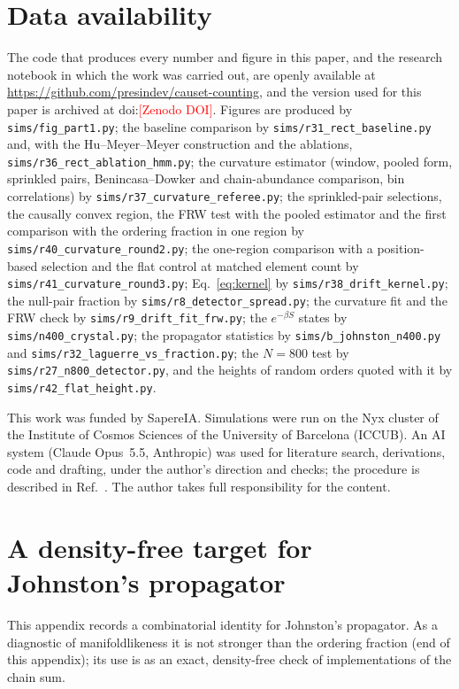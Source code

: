 \documentclass[prd,twocolumn,superscriptaddress,nofootinbib,amsmath,amssymb,floatfix]{revtex4-2}
\newcommand{\pending}[1]{\textcolor{red}{[#1]}}
\begin{document}
\section*{Data availability}
The code that produces every number and figure in this paper, and the research notebook in which the work was carried out, are openly available at \url{https://github.com/presindev/causet-counting}, and the version used for this paper is archived at doi:\pending{Zenodo DOI}. Figures are produced by \texttt{sims/fig\_part1.py}; the baseline comparison by \texttt{sims/r31\_rect\_baseline.py} and, with the Hu--Meyer--Meyer construction and the ablations, \texttt{sims/r36\_rect\_ablation\_hmm.py}; the curvature estimator (window, pooled form, sprinkled pairs, Benincasa--Dowker and chain-abundance comparison, bin correlations) by \texttt{sims/r37\_curvature\_referee.py}; the sprinkled-pair selections, the causally convex region, the FRW test with the pooled estimator and the first comparison with the ordering fraction in one region by \texttt{sims/r40\_curvature\_round2.py}; the one-region comparison with a position-based selection and the flat control at matched element count by \texttt{sims/r41\_curvature\_round3.py}; Eq.~\eqref{eq:kernel} by \texttt{sims/r38\_drift\_kernel.py}; the null-pair fraction by \texttt{sims/r8\_detector\_spread.py}; the curvature fit and the FRW check by \texttt{sims/r9\_drift\_fit\_frw.py}; the $e^{-\beta S}$ states by \texttt{sims/n400\_crystal.py}; the propagator statistics by \texttt{sims/b\_johnston\_n400.py} and \texttt{sims/r32\_laguerre\_vs\_fraction.py}; the $N=800$ test by \texttt{sims/r27\_n800\_detector.py}, and the heights of random orders quoted with it by \texttt{sims/r42\_flat\_height.py}.

\begin{acknowledgments}
This work was funded by SapereIA. Simulations were run on the Nyx cluster of the Institute of Cosmos Sciences of the University of Barcelona (ICCUB). An AI system (Claude Opus~5.5, Anthropic) was used for literature search, derivations, code and drafting, under the author's direction and checks; the procedure is described in Ref.~\cite{MethodNote}. The author takes full responsibility for the content.
\end{acknowledgments}

\appendix
\section{A density-free target for Johnston's propagator}\label{app:prop}
This appendix records a combinatorial identity for Johnston's propagator. As a diagnostic of manifoldlikeness it is not stronger than the ordering fraction (end of this appendix); its use is as an exact, density-free check of implementations of the chain sum.
\end{document}
